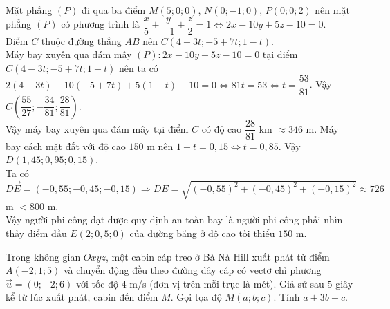 \begin{ex}
{\begin{itemchoice}
			\itemch Mặt phẳng $(P)$ đi qua ba điểm $M(5;0;0)$, $N(0;-1;0)$, $P(0;0;2)$ nên mặt phẳng $(P)$ có phương  trình là $\dfrac{x}{5}+\dfrac{y}{-1}+\dfrac{z}{2}=1\Leftrightarrow 2x-10y+5z-10=0$.\\
			Điểm $C$ thuộc đường thẳng $AB$  nên $C(4-3t;-5+7t;1-t)$.\\
			Máy bay xuyên qua đám mây $(P)\colon 2x-10y+5z-10=0$ tại điểm $C(4-3t;-5+7t;1-t)$ nên ta  có $2(4-3t)-10(-5+7t)+5(1-t)-10=0\Leftrightarrow 81t=53\Leftrightarrow t=\dfrac{53}{81}$.
			Vậy $C\left(\dfrac{55}{27};-\dfrac{34}{81};\dfrac{28}{81} \right)$.\\ 
			 Vậy máy bay xuyên qua đám mây tại điểm $C$ có độ cao $\dfrac{28}{81}$ km $\approx 346 $ m.
			 \itemch
			Máy bay cách mặt đất với độ cao $150 $  m nên $1-t=0{,}15\Leftrightarrow t=0{,}85$. Vậy $D(1{,}45;0{,}95;0{,}15)$.\\
			Ta  có $\overrightarrow{DE}=(-0{,}55;-0{,}45;-0{,}15) \Rightarrow DE=\sqrt{(-0 {,}55)^2+(-0{,}45)^2+(-0{,}15)^2} \approx 726$ m $ < 800$ m.\\
			Vậy người phi công đạt được quy định an toàn bay là người phi công phải nhìn thấy điểm đầu $E(2;0,5;0)$ của đường băng ở độ  cao tối thiểu $150$ m.
		\end{itemchoice}
	} 
\end{ex}



\begin{bt}%
	Trong không gian $Oxyz$, một cabin  cáp treo ở Bà Nà Hill xuất phát từ điểm $A(-2;1;5)$ và chuyển động đều theo đường dây cáp có vectơ chỉ phương $\overrightarrow{u} = (0;-2;6)$ với tốc độ $4$ m/s (đơn vị trên mỗi trục là mét). Giả sử sau $5$ giây kể từ lúc xuất phát, cabin đến điểm $M$. Gọi tọa độ $M(a;b;c)$. Tính $a + 3b + c$.
\end{bt}

